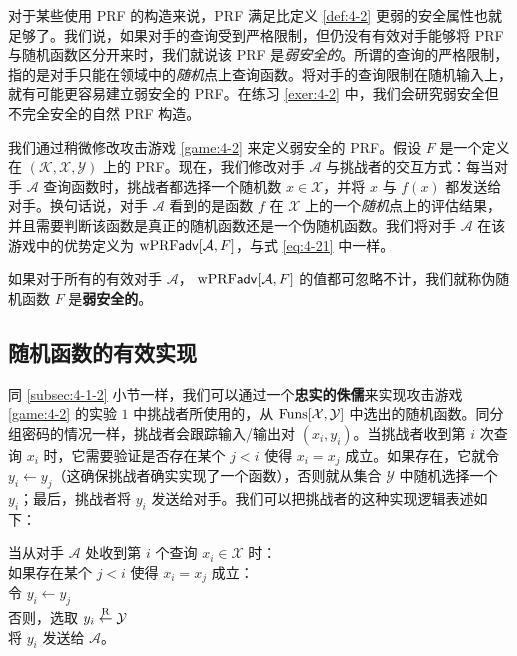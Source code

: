 \begin{snote}[弱安全的伪随机函数。]
对于某些使用 PRF 的构造来说，PRF 满足比定义 \ref{def:4-2} 更弱的安全属性也就足够了。我们说，如果对手的查询受到严格限制，但仍没有有效对手能够将 PRF 与随机函数区分开来时，我们就说该 PRF 是\emph{弱安全的}。所谓的查询的严格限制，指的是对手只能在领域中的\emph{随机}点上查询函数。将对手的查询限制在随机输入上，就有可能更容易建立弱安全的 PRF。在练习 \ref{exer:4-2} 中，我们会研究弱安全但不完全安全的自然 PRF 构造。

我们通过稍微修改攻击游戏 \ref{game:4-2} 来定义弱安全的 PRF。假设 $F$ 是一个定义在 $(\mathcal{K},\mathcal{X},\mathcal{Y})$ 上的 PRF。现在，我们修改对手 $\mathcal{A}$ 与挑战者的交互方式：每当对手 $\mathcal{A}$ 查询函数时，挑战者都选择一个随机数 $x\in\mathcal{X}$，并将 $x$ 与 $f(x)$ 都发送给对手。换句话说，对手 $\mathcal{A}$ 看到的是函数 $f$ 在 $\mathcal{X}$ 上的一个\emph{随机}点上的评估结果，并且需要判断该函数是真正的随机函数还是一个伪随机函数。我们将对手 $\mathcal{A}$ 在该游戏中的优势定义为 ${\rm wPRF\mathsf{adv}}[\mathcal{A}, F]$，与式 \ref{eq:4-21} 中一样。
\end{snote}

\begin{definition}\label{def:4-3}
如果对于所有的有效对手 $\mathcal{A}$， ${\rm wPRF\mathsf{adv}}[\mathcal{A}, F]$ 的值都可忽略不计，我们就称伪随机函数 $F$ 是\textbf{弱安全的}。
\end{definition}

\subsection{随机函数的有效实现}\label{subsec:4-4-2}

同 \ref{subsec:4-1-2} 小节一样，我们可以通过一个\textbf{忠实的侏儒}来实现攻击游戏 \ref{game:4-2} 的实验 $1$ 中挑战者所使用的，从 ${\rm Funs}[\mathcal{X},\mathcal{Y}]$ 中选出的随机函数。同分组密码的情况一样，挑战者会跟踪输入/输出对 $(x_i,y_i)$。当挑战者收到第 $i$ 次查询 $x_i$ 时，它需要验证是否存在某个 $j < i$ 使得 $x_i=x_j$ 成立。如果存在，它就令 $y_i\leftarrow y_j$（这确保挑战者确实实现了一个函数），否则就从集合 $\mathcal{Y}$ 中随机选择一个 $y_i$；最后，挑战者将 $y_i$ 发送给对手。我们可以把挑战者的这种实现逻辑表述如下：

\vspace{10pt}

\hspace*{5pt} 当从对手 $\mathcal{A}$ 处收到第 $i$ 个查询 $x_i\in\mathcal{X}$ 时：\\
\hspace*{50pt} 如果存在某个 $j<i$ 使得 $x_i=x_j$ 成立：\\
\hspace*{75pt} 令 $y_i\leftarrow y_j$\\
\hspace*{75pt} 否则，选取 $y_i\overset{\rm R}\leftarrow\mathcal{Y}$\\
\hspace*{50pt} 将 $y_i$ 发送给 $\mathcal{A}$。\\

